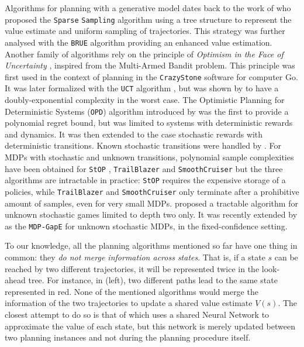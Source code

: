 \documentclass[runningheads]{llncs}
\begin{document}
Algorithms for planning with a generative model dates back to the work of \citet{Kearns02SS} who proposed the \texttt{Sparse} \texttt{Sampling} algorithm using a tree structure to represent the value estimate and uniform sampling of trajectories. This strategy was further analysed with the \texttt{BRUE} algorithm \citep{Feldman14BRUE} providing an enhanced value estimation. Another family of algorithms rely on the principle of \emph{Optimism in the Face of Uncertainty} \citep[surveyed by][]{Munos14}, inspired from the Multi-Armed Bandit problem. This principle was first used in the context of planning in the \texttt{CrazyStone} software \citep{Coulom2006} for computer Go. It was later formalized with the \texttt{UCT} algorithm \citep{Kocsis06UCT}, but was shown by \citet{Coquelin2007} to have a doubly-exponential complexity in the worst case. The {Optimistic Planning for Deterministic Systems} (\texttt{OPD}) algorithm introduced by \citet{Hren2008optimistic} was the first to provide a polynomial regret bound, but was limited to systems with deterministic rewards and dynamics. It was then extended to the case stochastic rewards \citep{Bubeck2010open,Leurent2019practical} with deterministic transitions.
Known stochastic transitions were handled by \citet{Busoniu2012optimistic}. For MDPs with stochastic and unknown transitions, polynomial sample complexities have been obtained for \texttt{StOP} \citep{Szorenyi14}, \texttt{TrailBlazer} \citep{Grill16} and \texttt{SmoothCruiser} \citep{Grill19} but the three algorithms are intractable in practice: \texttt{StOP} requires the expensive storage of a policies, while \texttt{TrailBlazer} and \texttt{SmoothCruiser} only terminate after a prohibitive amount of samples, even for very small MDPs. 
\citep{Kaufmann2017} proposed a tractable algorithm for unknown stochastic games limited to depth two only. It was recently extended by \citet{MDPGapE2020} as the \texttt{MDP-GapE} for unknown stochastic MDPs, in the fixed-confidence setting.

To our knowledge, all the planning algorithms mentioned so far have one thing in common: they \emph{do not merge information across states}. That is, if a state $s$ can be reached by two different trajectories, it will be represented twice in the look-ahead tree. For instance, in  (left), two different paths lead to the same state represented in red. None of the mentioned algorithms would merge the information of the two trajectories to update a shared value estimate $V(s)$. The closest attempt to do so is that of \citet{Silver18} which uses a shared Neural Network to approximate the value of each state, but this network is merely updated between two planning instances and not during the planning procedure itself.
\end{document}
